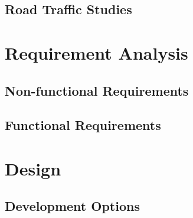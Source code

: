 \documentclass[authoryearcitations]{UoYCSproject}
\begin{document}
\section{Road Traffic Studies}

\chapter{Requirement Analysis}

\section{Non-functional Requirements}

\section{Functional Requirements}

\chapter{Design}

\section{Development Options}





\end{document}
